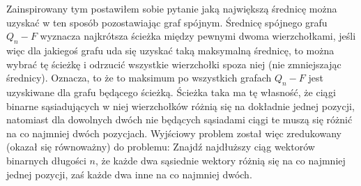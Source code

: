 \documentclass{pracamgr}
\begin{document}
   Zainspirowany tym postawiłem sobie pytanie jaką największą średnicę można uzyskać w ten sposób pozostawiając graf spójnym.
   Średnicę spójnego grafu $Q_n-F$ wyznacza najkrótsza ścieżka między pewnymi dwoma wierzchołkami, jeśli więc dla jakiegoś grafu uda się uzyskać
   taką maksymalną średnicę, to można wybrać tę ścieżkę i odrzucić wszystkie wierzchołki spoza niej (nie zmniejszając średnicy).
   Oznacza, to że to maksimum po wszystkich grafach $Q_n-F$ jest uzyskiwane dla grafu będącego ścieżką.
   Ścieżka taka ma tę własność, że ciągi binarne sąsiadujących w niej wierzchołków różnią się na dokładnie jednej pozycji,
   natomiast dla dowolnych dwóch nie będących sąsiadami ciągi te muszą się różnić na co najmniej dwóch pozycjach.
   Wyjściowy problem został więc zredukowany (okazał się równoważny) do problemu:\newline
   Znajdź najdłuższy ciąg wektorów binarnych długości $n$,
   że każde dwa sąsiednie wektory różnią się na co najmniej jednej pozycji, zaś każde dwa inne na co najmniej dwóch.
\end{document}
